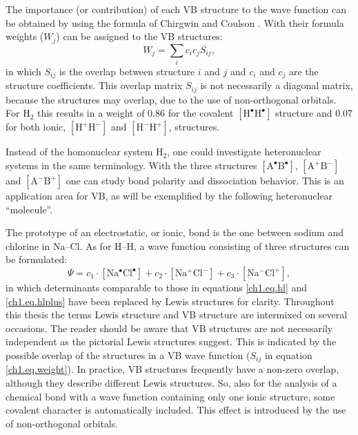 The importance (or contribution) of each VB structure to the wave function can be obtained by using the formula of Chirgwin and Coulson \cite{chirgwin}. With their formula weights ($W_j$) can be assigned to the VB structures:
\begin{equation}
W_{j}=\sum_{i} c_{i}c_{j}S_{ij},
\label{ch1.eq.weight}
\end{equation}
in which $S_{ij}$ is the overlap between structure $i$ and $j$ and $c_i$ and $c_j$ are the structure coefficients. This overlap matrix $S_{ij}$ is not necessarily a diagonal matrix, because the structures may overlap, due to the use of non-orthogonal orbitals. For H$_2$ this results in a weight of 0.86 for the covalent $\mathrm{[H^\bullet H^\bullet]}$ structure and 0.07 for both ionic, $\mathrm{[H^{+} H^{-}]}$ and $\mathrm{[H^{-} H^{+}]}$, structures. 

Instead of the homonuclear system H$_2$, one could investigate heteronuclear systems in the same terminology. With the three structures $\mathrm{[A^\bullet B^\bullet]}$, $\mathrm{[A^{+} B^{-}]}$ and $\mathrm{[A^{-} B^{+}]}$ one can study bond polarity and dissociation behavior. This is an application area for VB, as will be exemplified by the following heteronuclear ``molecule''.

The prototype of an electrostatic, or ionic, bond is the one between sodium and chlorine in \mbox{Na--Cl}. As for H--H, a wave function consisting of three structures can be formulated:
\begin{equation}
\Psi = c_1 \cdot \mathrm{[Na^\bullet Cl^\bullet]} + c_2 \cdot \mathrm{[Na^{+} Cl^{-}]} + c_3 \cdot \mathrm{[Na^{-} Cl^{+}]},
\label{ch1.eq.nacl}
\end{equation}
in which determinants comparable to those in equations \ref{ch1.eq.hl} and \ref{ch1.eq.hlplus} have been replaced by Lewis structures for clarity. Throughout this thesis the terms Lewis structure and VB structure are intermixed on several occasions. The reader should be aware that VB structures are not necessarily independent as the pictorial Lewis structures suggest. This is indicated by the possible overlap of the structures in a VB wave function ($S_{ij}$ in equation \ref{ch1.eq.weight}). In practice, VB structures frequently have a non-zero overlap, although they describe different Lewis structures. So, also for the analysis of a chemical bond with a wave function containing only one ionic structure, some covalent character is automatically included. This effect is introduced by the use of non-orthogonal orbitals.

